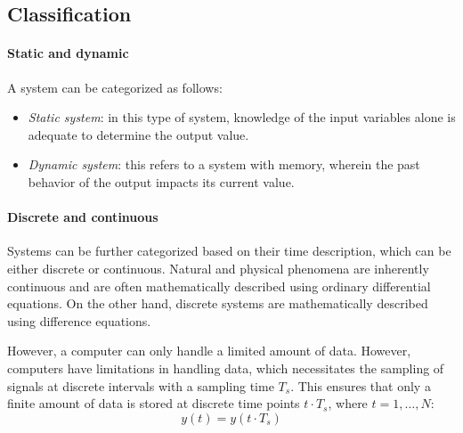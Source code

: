 \subsection{Classification}

\paragraph*{Static and dynamic}
A system can be categorized as follows:
\begin{itemize}
    \item \textit{Static system}: in this type of system, knowledge of the input variables alone is adequate to determine the output value.
    \item \textit{Dynamic system}: this refers to a system with memory, wherein the past behavior of the output impacts its current value.
\end{itemize}

\paragraph*{Discrete and continuous}
Systems can be further categorized based on their time description, which can be either discrete or continuous.
Natural and physical phenomena are inherently continuous and are often mathematically described using ordinary differential equations.
On the other hand, discrete systems are mathematically described using difference equations.

However, a computer can only handle a limited amount of data. 
However, computers have limitations in handling data, which necessitates the sampling of signals at discrete intervals with a sampling time $T_s$. 
This ensures that only a finite amount of data is stored at discrete time points $t \cdot T_s$, where $t=1,\dots,N$: 
\[y(t)=y(t \cdot T_s)\]